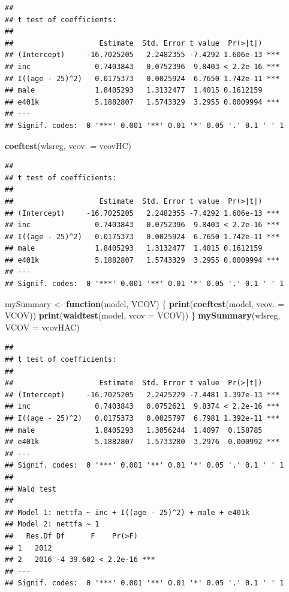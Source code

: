 \documentclass[]{book}
\newenvironment{Shaded}{\begin{snugshade}}{\end{snugshade}}
\newcommand{\ControlFlowTok}[1]{\textcolor[rgb]{0.13,0.29,0.53}{\textbf{#1}}}
\newcommand{\DataTypeTok}[1]{\textcolor[rgb]{0.13,0.29,0.53}{#1}}
\newcommand{\KeywordTok}[1]{\textcolor[rgb]{0.13,0.29,0.53}{\textbf{#1}}}
\newcommand{\NormalTok}[1]{#1}
\newcommand{\StringTok}[1]{\textcolor[rgb]{0.31,0.60,0.02}{#1}}
\begin{document}
\begin{verbatim}
## 
## t test of coefficients:
## 
##                    Estimate  Std. Error t value  Pr(>|t|)    
## (Intercept)     -16.7025205   2.2482355 -7.4292 1.606e-13 ***
## inc               0.7403843   0.0752396  9.8403 < 2.2e-16 ***
## I((age - 25)^2)   0.0175373   0.0025924  6.7650 1.742e-11 ***
## male              1.8405293   1.3132477  1.4015 0.1612159    
## e401k             5.1882807   1.5743329  3.2955 0.0009994 ***
## ---
## Signif. codes:  0 '***' 0.001 '**' 0.01 '*' 0.05 '.' 0.1 ' ' 1
\end{verbatim}

\begin{Shaded}
\begin{Highlighting}[]
\KeywordTok{coeftest}\NormalTok{(wlsreg, }\DataTypeTok{vcov. =}\NormalTok{ vcovHC)}
\end{Highlighting}
\end{Shaded}

\begin{verbatim}
## 
## t test of coefficients:
## 
##                    Estimate  Std. Error t value  Pr(>|t|)    
## (Intercept)     -16.7025205   2.2482355 -7.4292 1.606e-13 ***
## inc               0.7403843   0.0752396  9.8403 < 2.2e-16 ***
## I((age - 25)^2)   0.0175373   0.0025924  6.7650 1.742e-11 ***
## male              1.8405293   1.3132477  1.4015 0.1612159    
## e401k             5.1882807   1.5743329  3.2955 0.0009994 ***
## ---
## Signif. codes:  0 '***' 0.001 '**' 0.01 '*' 0.05 '.' 0.1 ' ' 1
\end{verbatim}

\begin{Shaded}
\begin{Highlighting}[]
\NormalTok{mySummary <-}\StringTok{ }\ControlFlowTok{function}\NormalTok{(model, VCOV) \{}
  \KeywordTok{print}\NormalTok{(}\KeywordTok{coeftest}\NormalTok{(model, }\DataTypeTok{vcov. =}\NormalTok{ VCOV))}
  \KeywordTok{print}\NormalTok{(}\KeywordTok{waldtest}\NormalTok{(model, }\DataTypeTok{vcov =}\NormalTok{ VCOV))}
\NormalTok{\}}
\KeywordTok{mySummary}\NormalTok{(wlsreg, }\DataTypeTok{VCOV =}\NormalTok{ vcovHAC)}
\end{Highlighting}
\end{Shaded}

\begin{verbatim}
## 
## t test of coefficients:
## 
##                    Estimate  Std. Error t value  Pr(>|t|)    
## (Intercept)     -16.7025205   2.2425229 -7.4481 1.397e-13 ***
## inc               0.7403843   0.0752621  9.8374 < 2.2e-16 ***
## I((age - 25)^2)   0.0175373   0.0025797  6.7981 1.392e-11 ***
## male              1.8405293   1.3056244  1.4097  0.158785    
## e401k             5.1882807   1.5733280  3.2976  0.000992 ***
## ---
## Signif. codes:  0 '***' 0.001 '**' 0.01 '*' 0.05 '.' 0.1 ' ' 1
## 
## Wald test
## 
## Model 1: nettfa ~ inc + I((age - 25)^2) + male + e401k
## Model 2: nettfa ~ 1
##   Res.Df Df      F    Pr(>F)    
## 1   2012                        
## 2   2016 -4 39.602 < 2.2e-16 ***
## ---
## Signif. codes:  0 '***' 0.001 '**' 0.01 '*' 0.05 '.' 0.1 ' ' 1
\end{verbatim}
\end{document}
